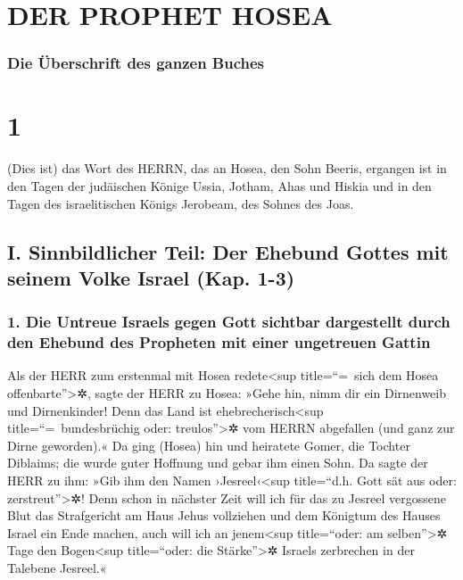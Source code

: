 \hypertarget{der-prophet-hosea}{%
\section{DER PROPHET HOSEA}\label{der-prophet-hosea}}

\hypertarget{die-uxfcberschrift-des-ganzen-buches}{%
\subsubsection{Die Überschrift des ganzen
Buches}\label{die-uxfcberschrift-des-ganzen-buches}}

\hypertarget{section}{%
\section{1}\label{section}}

 (Dies ist) das Wort des HERRN, das an Hosea, den Sohn
Beeris, ergangen ist in den Tagen der judäischen Könige Ussia, Jotham,
Ahas und Hiskia und in den Tagen des israelitischen Königs Jerobeam, des
Sohnes des Joas.

\hypertarget{i.-sinnbildlicher-teil-der-ehebund-gottes-mit-seinem-volke-israel-kap.-1-3}{%
\subsection{I. Sinnbildlicher Teil: Der Ehebund Gottes mit seinem Volke
Israel (Kap.
1-3)}\label{i.-sinnbildlicher-teil-der-ehebund-gottes-mit-seinem-volke-israel-kap.-1-3}}

\hypertarget{die-untreue-israels-gegen-gott-sichtbar-dargestellt-durch-den-ehebund-des-propheten-mit-einer-ungetreuen-gattin}{%
\subsubsection{1. Die Untreue Israels gegen Gott sichtbar dargestellt
durch den Ehebund des Propheten mit einer ungetreuen
Gattin}\label{die-untreue-israels-gegen-gott-sichtbar-dargestellt-durch-den-ehebund-des-propheten-mit-einer-ungetreuen-gattin}}

 Als der HERR zum erstenmal mit Hosea redete\textless sup
title=``=~sich dem Hosea offenbarte''\textgreater✲, sagte der HERR zu
Hosea: »Gehe hin, nimm dir ein Dirnenweib und Dirnenkinder! Denn das
Land ist ehebrecherisch\textless sup title=``=~bundesbrüchig oder:
treulos''\textgreater✲ vom HERRN abgefallen (und ganz zur Dirne
geworden).«  Da ging (Hosea) hin und heiratete Gomer, die
Tochter Diblaims; die wurde guter Hoffnung und gebar ihm einen Sohn.
 Da sagte der HERR zu ihm: »Gib ihm den Namen
›Jesreel‹\textless sup title=``d.h. Gott sät aus oder:
zerstreut''\textgreater✲! Denn schon in nächster Zeit will ich für das
zu Jesreel vergossene Blut das Strafgericht am Haus Jehus vollziehen und
dem Königtum des Hauses Israel ein Ende machen,  auch will
ich an jenem\textless sup title=``oder: am selben''\textgreater✲ Tage
den Bogen\textless sup title=``oder: die Stärke''\textgreater✲ Israels
zerbrechen in der Talebene Jesreel.«

